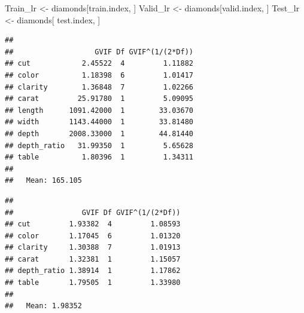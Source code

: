 \documentclass[
]{article}
\newenvironment{Shaded}{\begin{snugshade}}{\end{snugshade}}
\newcommand{\AttributeTok}[1]{\textcolor[rgb]{0.77,0.63,0.00}{#1}}
\newcommand{\DecValTok}[1]{\textcolor[rgb]{0.00,0.00,0.81}{#1}}
\newcommand{\FunctionTok}[1]{\textcolor[rgb]{0.00,0.00,0.00}{#1}}
\newcommand{\NormalTok}[1]{#1}
\newcommand{\OtherTok}[1]{\textcolor[rgb]{0.56,0.35,0.01}{#1}}
\newcommand{\SpecialCharTok}[1]{\textcolor[rgb]{0.00,0.00,0.00}{#1}}
\begin{document}
\begin{Shaded}
\begin{Highlighting}[]
\NormalTok{Train\_lr }\OtherTok{\textless{}{-}}\NormalTok{ diamonds[train.index, ]}
\NormalTok{Valid\_lr }\OtherTok{\textless{}{-}}\NormalTok{ diamonds[valid.index, ]}
\NormalTok{Test\_lr  }\OtherTok{\textless{}{-}}\NormalTok{ diamonds[ test.index, ]}
\end{Highlighting}
\end{Shaded}

\begin{Shaded}
\end{Shaded}

\begin{verbatim}
## 
##                   GVIF Df GVIF^(1/(2*Df))
## cut            2.45522  4         1.11882
## color          1.18398  6         1.01417
## clarity        1.36848  7         1.02266
## carat         25.91780  1         5.09095
## length      1091.42000  1        33.03670
## width       1143.44000  1        33.81480
## depth       2008.33000  1        44.81440
## depth_ratio   31.99350  1         5.65628
## table          1.80396  1         1.34311
## 
##   Mean: 165.105
\end{verbatim}

\begin{Shaded}
\end{Shaded}

\begin{verbatim}
## 
##                GVIF Df GVIF^(1/(2*Df))
## cut         1.93382  4         1.08593
## color       1.17045  6         1.01320
## clarity     1.30388  7         1.01913
## carat       1.32381  1         1.15057
## depth_ratio 1.38914  1         1.17862
## table       1.79505  1         1.33980
## 
##   Mean: 1.98352
\end{verbatim}
\end{document}
